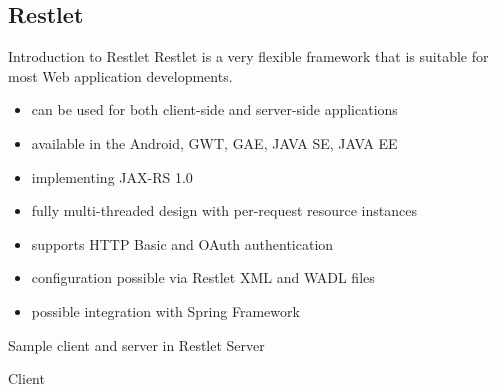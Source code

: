 \subsection{Restlet}
	\begin{frame}{Introduction to Restlet}
		Restlet is a very flexible framework that is suitable for most Web application developments.	
		
		\begin{itemize}
		  \item can be used for both client-side and server-side applications
		  \item available in the Android, GWT, GAE, JAVA SE, JAVA EE
		  \item implementing JAX-RS 1.0
		  \item fully multi-threaded design with per-request resource instances
		  \item supports HTTP Basic and OAuth authentication
		  \item configuration possible via Restlet XML and WADL files
		  \item possible integration with Spring Framework
		\end{itemize}
	\end{frame}
	
	\begin{frame}{Sample client and server in Restlet} 
		Server
		
		Client
		
	\end{frame}

